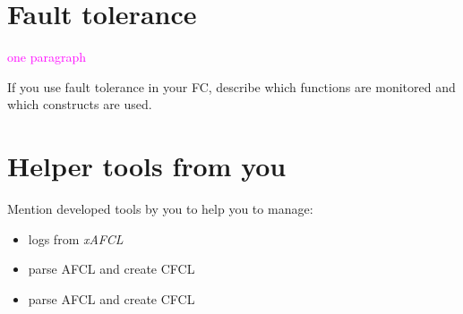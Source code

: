 %
%
%
\section{Fault tolerance}

\textcolor{magenta}{one paragraph}

If you use fault tolerance in your FC, describe which functions are monitored and which constructs are used.


%
%
%
\section{Helper tools from you}

Mention developed tools by you to help you to manage:
\begin{itemize}
    \item logs from \textit{xAFCL}
    \item parse AFCL and create CFCL
    \item parse AFCL and create CFCL
\end{itemize}

